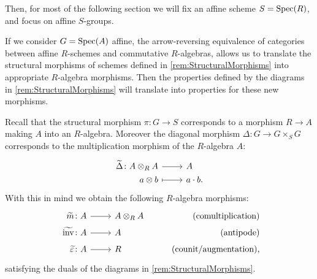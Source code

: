 Then, for most of the following section we will fix an affine scheme
$S = \operatorname{Spec}(R)$, and focus on affine $S$-groups.


\begin{rem}[]
If we consider $G = \operatorname{Spec}(A)$ affine, 
the arrow-reversing equivalence of categories between
affine $R$-schemes and commutative $R$-algebras, 
allows us to translate the structural morphisms
of schemes defined in \cref{rem:StructuralMorphisms} into
appropriate $R$-algebra morphisms.
Then the properties defined by the diagrams in \cref{rem:StructuralMorphisms}
will translate into properties for these new morphisms.

Recall that the structural morphism $\pi\colon G \to S$ corresponds to a
morphism $R \to A$ making $A$ into an $R$-algebra.
Moreover the diagonal morphism $\Delta\colon G \to G \times_{ S } G$ corresponds
to the multiplication morphism of the $R$-algebra $A$:
\begin{equation*}
\begin{tikzcd}[row sep = 0ex
	,/tikz/column 1/.append style={anchor=base east}
	,/tikz/column 2/.append style={anchor=base west}]
	\widetilde{\Delta}\colon A \otimes_R A \arrow[r, "", rightarrow] &
	A \\
	a \otimes b \arrow[r, "", mapsto] & a \cdot b
.\end{tikzcd}
\end{equation*} 
With this in mind we obtain the following $R$-algebra morphisms:
\begin{equation*}
		\begin{tikzcd}[row sep = 0ex
 ,/tikz/column 1/.append style={anchor=base east}
 ,/tikz/column 2/.append style={anchor=base west}
 ,/tikz/column 3/.append style={anchor=base east}]
		\widetilde{m}\colon A \arrow[r, "", rightarrow] &
		A \otimes_R A & \text{(comultiplication)} \\
		\widetilde{\operatorname{inv}}\colon A \arrow[r, "", rightarrow] &
		A & \text{(antipode)} \\
		\phantom{\widetilde{\operatorname{inv}}}\widetilde{\varepsilon} \colon A
		\arrow[r, "", rightarrow] &
		R & \text{(counit/augmentation),}
	\end{tikzcd}
\end{equation*} 
satisfying the duals of the diagrams in \cref{rem:StructuralMorphisms}.
\end{rem}


